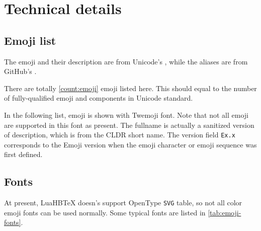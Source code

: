 \documentclass{l3doc}
\newcounter { emoji }
\def\LuaHBTeX{LuaHB\TeX}
\begin{document}
  

\section{ Technical details}

\subsection{ Emoji list}
\label{subsec:emoji-list}

The emoji and their description are from Unicode's
\href{https://www.unicode.org/Public/emoji/latest/emoji-test.txt}{},
while the aliases are from GitHub's
\href{https://github.com/github/gemoji/blob/master/db/emoji.json}{}.

There are totally \ref*{count:emoji} emoji listed here. This should equal to the number of
fully-qualified emoji and components in Unicode standard.

In the following list, emoji is shown with Twemoji font. Note that not all emoji are supported
in this font as present. The fullname is actually a sanitized version of description, which is
from the CLDR short name. The version field \texttt{Ex.x} corresponds to the Emoji version when
the emoji character or emoji sequence was first defined.

\EMOJITABLE

\subsection{ Fonts}

At present, \LuaHBTeX{} doesn's support OpenType \texttt{SVG} table, so not all color emoji fonts
can be used normally. Some typical fonts are listed in \autoref{tab:emoji-fonts}.

\begingroup

\def\y{\emoji{white-check-mark}}
\def\x{\emoji{negative-squared-cross-mark}}
\small
\end{document}
